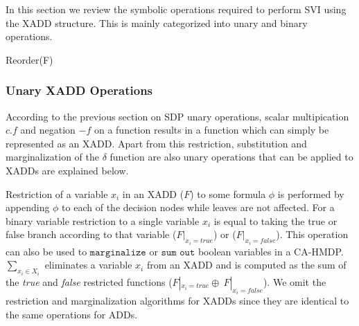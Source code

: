 \documentclass[twoside,11pt]{article}
\begin{document}
In this section we review the symbolic operations required to perform SVI using the XADD structure. This is mainly categorized into unary and binary operations.   
\begin{algorithm}[t!]

\BlankLine
{}
\caption{{\sc Reorder}(F)  \label{alg:reorder}}
\end{algorithm}
\subsubsection{Unary XADD Operations}
According to the previous section on SDP unary operations, scalar multipication $c.f$ and negation $- f$ on a function results in a function which can simply be represented as an XADD. Apart from this restriction, substitution and marginalization of the $\delta$ function are also unary operations that can be applied to XADDs are explained below.  

Restriction of a variable $x_i$ in an XADD ($F$) to some formula $\phi$ is performed by appending $\phi$ to each of the decision nodes while leaves are not affected. %
For a binary variable restriction to a single variable $x_i$ is equal to taking the true or false branch according to that variable 
($F|_{x_i=true}$) or ($F|_{x_i=false}$). 
This operation can also be used to $\texttt{marginalize}$ or $\texttt{sum out}$ boolean variables in a CA-HMDP. 
$\sum_{x_i \in X_i}$ eliminates a variable $x_i$ from an XADD and is computed as the sum of the \emph{true} and \emph{false} restricted functions ($F|_{x_i=true} \oplus \ F|_{x_i=false}$). We omit the restriction and marginalization algorithms for XADDs since they are identical to the same operations for ADDs. 
\end{document}

